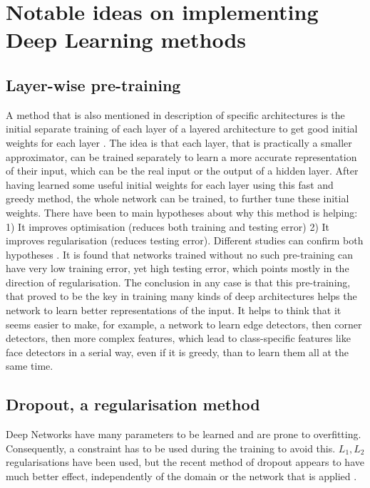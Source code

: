 \documentclass[a4paper]{article}
\begin{document}
\section{Notable ideas on implementing Deep Learning methods}
	\subsection{Layer-wise pre-training}
	\label{par:Pre-training}
		A method that is also mentioned in description of specific architectures is the initial separate training of each layer of a layered architecture to get good initial weights for each layer \cite{Hinton2006a,Bengio2007a}. The idea is that each layer, that is practically a smaller approximator, can be trained separately to learn a more accurate representation of their input, which can be the real input or the output of a hidden layer. After having learned some useful initial weights for each layer using this fast and greedy method, the whole network can be trained, to further tune these initial weights. 
		There have been to main hypotheses about why this method is helping: 1) It improves optimisation (reduces both training and testing error) 2) It improves regularisation (reduces testing error). Different studies can confirm both hypotheses \cite{Bengio2009}. It is found that networks trained without no such pre-training can have very low training error, yet high testing error, which points mostly in the direction of regularisation. The conclusion in any case is that this pre-training, that proved to be the key in training many kinds of deep architectures helps the network to learn better representations of the input. It helps to think that it seems easier to make, for example, a network to learn edge detectors, then corner detectors, then more complex features, which lead to class-specific features like face detectors in a serial way, even if it is greedy, than to learn them all at the same time.
	
	\subsection{Dropout, a regularisation method}
	\label{par:Dropout}
		Deep Networks have many parameters to be learned and are prone to overfitting. Consequently, a constraint has to be used during the training to avoid this. $L_1, L_2$ regularisations have been used, but the recent method of dropout appears to have much better effect, independently of the domain or the network that is applied \cite{Srivastava2014}.
		
\end{document}
